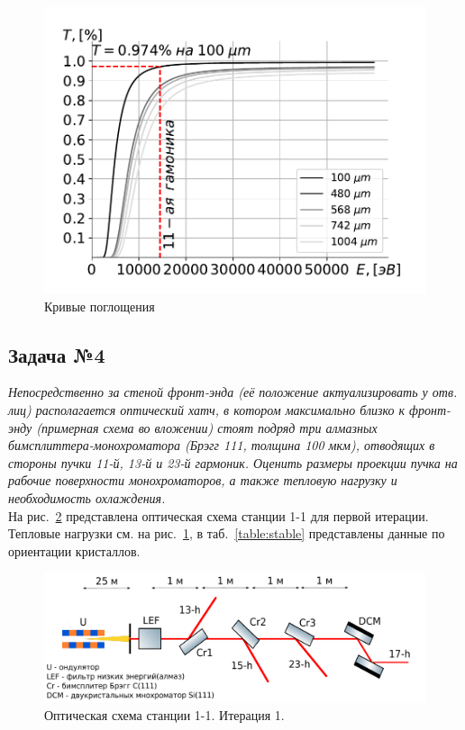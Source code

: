 \documentclass[14pt,a4paper]{extarticle}
\numberwithin{equation}{section}
\begin{document}
	\begin{figure}[h!]
		\centering  
		\includegraphics[width=\textwidth]{pic/bragg_T.pdf}	
		\caption{Кривые поглощения}
		\label{fig:absorb_spec}
	\end{figure}
	
	\subsection{Задача №4}
	\textit{Непосредственно за стеной фронт-энда (её положение актуализировать у отв. лиц) располагается оптический хатч, в котором максимально близко к фронт-энду (примерная схема во вложении) стоят подряд три алмазных бимсплиттера-монохроматора (Брэгг 111, толщина 100 мкм), отводящих в стороны пучки 11-й, 13-й и 23-й гармоник. Оценить размеры проекции пучка на рабочие поверхности монохроматоров, а также тепловую нагрузку и необходимость охлаждения.}\\
	На рис.~\ref{fig:OptScheme} представлена оптическая схема станции 1-1 для первой итерации. Тепловые нагрузки см. на рис.~\ref{fig:absorb_spec}, в таб.~\ref{table:stable} представлены данные по ориентации кристаллов.\\
	\newpage
	\begin{figure}[h!]
		\centering  
		\includegraphics[width=\textwidth]{pic/OptScheme.pdf}
		\caption{Оптическая схема станции 1-1. Итерация 1.}
		\label{fig:OptScheme}
	\end{figure}
\end{document}
